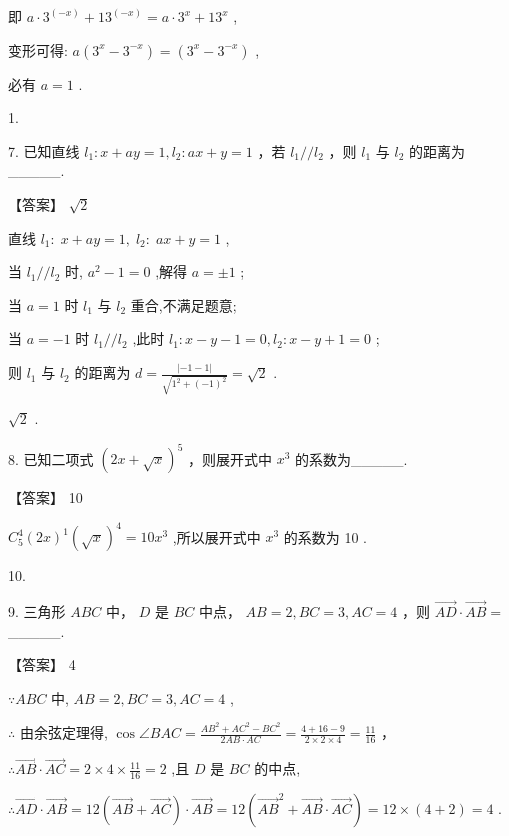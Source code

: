 \documentclass[10pt]{article}
\begin{document}
即 \(a \cdot  {3}^{\left( -x\right) } + {13}^{\left( -x\right) } = a \cdot  {3}^{x} + {13}^{x}\) ,

变形可得: \(a\left( {{3}^{x} - {3}^{-x}}\right)  = \left( {{3}^{x} - {3}^{-x}}\right)\) ,

必有 \(a = 1\) .

1.

7. 已知直线 \({l}_{1} : x + {ay} = 1,{l}_{2} : {ax} + y = 1\) ，若 \({l}_{1}//{l}_{2}\) ，则 \({l}_{1}\) 与 \({l}_{2}\) 的距离为\_\_\_\_\_.

【答案】 \(\sqrt{2}\)

直线 \({l}_{1} : \;x + {ay} = 1,\;{l}_{2} : \;{ax} + y = 1\) ,

当 \({l}_{1}//{l}_{2}\) 时, \({a}^{2} - 1 = 0\) ,解得 \(a =  \pm  1\) ;

当 \(a = 1\) 时 \({l}_{1}\) 与 \({l}_{2}\) 重合,不满足题意;

当 \(a =  - 1\) 时 \({l}_{1}//{l}_{2}\) ,此时 \({l}_{1} : x - y - 1 = 0,{l}_{2} : x - y + 1 = 0\) ;

则 \({l}_{1}\) 与 \({l}_{2}\) 的距离为 \(d = \frac{\left| -1 - 1\right| }{\sqrt{{1}^{2} + {\left( -1\right) }^{2}}} = \sqrt{2}\) .

\(\sqrt{2}\) .

8. 已知二项式 \({\left( 2x + \sqrt{x}\right) }^{5}\) ，则展开式中 \({x}^{3}\) 的系数为\_\_\_\_\_.

【答案】 10

\({C}_{5}^{4}{\left( 2x\right) }^{1}{\left( \sqrt{x}\right) }^{4} = {10}{x}^{3}\) ,所以展开式中 \({x}^{3}\) 的系数为 10 .

10.

9. 三角形 \({ABC}\) 中， \(D\) 是 \({BC}\) 中点， \({AB} = 2,{BC} = 3,{AC} = 4\) ，则 \(\overrightarrow{AD} \cdot  \overrightarrow{AB} =\) \_\_\_\_\_.

【答案】 4

\(\because {ABC}\) 中, \({AB} = 2,{BC} = 3,{AC} = 4\) ,

\(\therefore\) 由余弦定理得, \(\cos \angle {BAC} = \frac{A{B}^{2} + A{C}^{2} - B{C}^{2}}{{2A}B \cdot  {AC}} = \frac{4 + {16} - 9}{2 \times  2 \times  4} = \frac{11}{16}\) ，

\(\therefore \overrightarrow{AB} \cdot  \overrightarrow{AC} = 2 \times  4 \times  \frac{11}{16} = 2\) ,且 \(D\) 是 \({BC}\) 的中点,

\(\therefore \overrightarrow{AD} \cdot  \overrightarrow{AB} = {12}\left( {\overrightarrow{AB} + \overrightarrow{AC}}\right)  \cdot  \overrightarrow{AB} = {12}\left( {{\overrightarrow{AB}}^{2} + \overrightarrow{AB} \cdot  \overrightarrow{AC}}\right)  = {12} \times  \left( {4 + 2}\right)  = 4\) .
\end{document}
